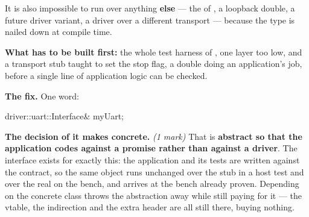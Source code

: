 It is also impossible to run  over anything \textbf{else} --- the
 of , a loopback double, a future driver variant, a driver over a
different transport --- because the type is nailed down at compile time.

\textbf{What has to be built first:} the whole test harness of , one layer too low, and a
transport stub taught to set the stop flag, a double doing an application's job, before a single line
of application logic can be checked.

\textbf{The fix.} One word:

\begin{cppcode}
driver::uart::Interface& myUart;
\end{cppcode}

\textbf{The decision of  it makes concrete.} \textit{(1 mark)} That
 is \textbf{abstract so that the application codes against a promise
rather than against a driver}. The interface exists for exactly this: the application and its tests
are written against the contract, so the same object runs unchanged over the stub in a host test and
over the real  on the bench, and arrives at the bench already proven. Depending on the
concrete class throws the abstraction away while still paying for it --- the vtable, the indirection
and the extra header are all still there, buying nothing.
